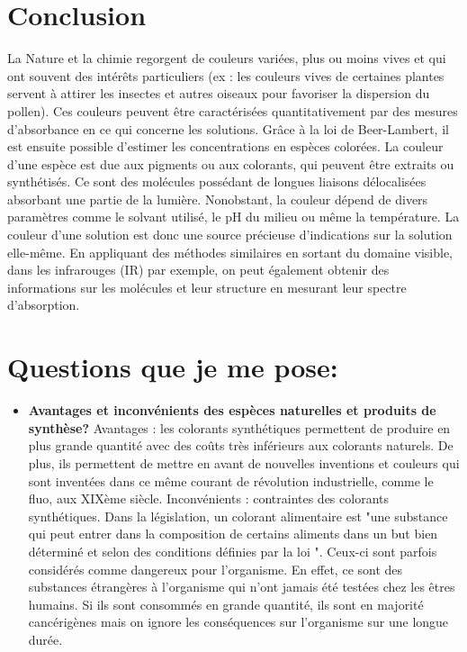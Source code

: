 \documentclass{article}
\begin{document}
\section{Conclusion}
La Nature et la chimie regorgent de couleurs variées, plus ou moins vives et qui ont souvent des intérêts particuliers (ex : les couleurs vives de certaines plantes servent à attirer les insectes et autres oiseaux pour favoriser la dispersion du pollen). Ces couleurs peuvent être caractérisées quantitativement par des mesures d’absorbance en ce qui concerne les solutions. Grâce à la loi de Beer-Lambert, il est ensuite possible d’estimer les concentrations en espèces colorées.
La couleur d’une espèce est due aux pigments ou aux colorants, qui peuvent être extraits ou synthétisés. Ce sont des molécules possédant de longues liaisons délocalisées absorbant une partie de la lumière. Nonobstant, la couleur dépend de divers paramètres comme le solvant utilisé, le pH du milieu ou même la température. La couleur d’une solution est donc une source précieuse d’indications sur la solution elle-même.
En appliquant des méthodes similaires en sortant du domaine visible, dans les infrarouges (IR) par exemple, on peut également obtenir des informations sur les molécules et leur structure en mesurant leur spectre d’absorption.

\section*{Questions que je me pose:}
\begin{itemize}
\item \textbf{Avantages et inconvénients des espèces naturelles et produits de synthèse?}
 Avantages : les colorants synthétiques permettent de produire en plus grande quantité avec des coûts très inférieurs aux colorants naturels. De plus, ils permettent de mettre en avant de nouvelles inventions et couleurs qui sont inventées dans ce même courant de révolution industrielle, comme le fluo, aux XIXème siècle.\medskip
 Inconvénients : contraintes des colorants synthétiques. Dans la législation, un colorant alimentaire est "une substance qui peut entrer dans la composition de certains aliments dans un but bien déterminé et selon des conditions définies par la loi ". Ceux-ci sont parfois considérés comme dangereux pour l'organisme. En effet, ce sont des substances étrangères à l'organisme qui n'ont jamais été testées chez les êtres humains. Si ils sont consommés en grande quantité, ils sont en majorité cancérigènes mais on ignore les conséquences sur l'organisme sur une longue durée. 

\end{itemize}
\end{document}
